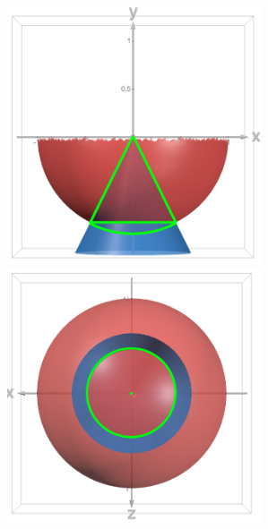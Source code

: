 \begin{enumerate}
    \begin{center}
        \includegraphics[width=7.5cm]{images/4b2}
        \includegraphics[width=7.5cm]{images/4b3}
    \end{center}

\end{enumerate}

\clearpage
